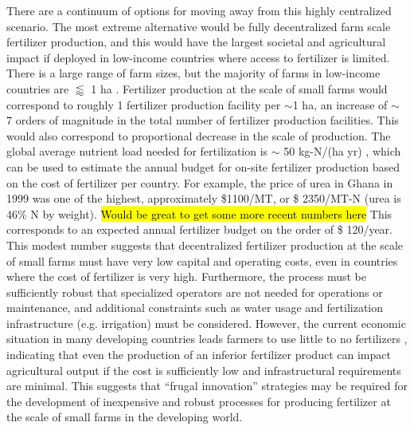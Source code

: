 There are a continuum of options for moving away from this highly centralized scenario. The most extreme alternative would be fully decentralized farm scale fertilizer production, and this would have the largest societal and agricultural impact if deployed in low-income countries where access to fertilizer is limited. There is a large range of farm sizes, but the majority of farms in low-income countries are $\lessapprox$  1 ha \cite{Lowder_2016}. Fertilizer production at the scale of small farms would  correspond to roughly 1 fertilizer production facility per $\sim$1 ha, an increase of $\sim$ 7 orders of magnitude in the total number of fertilizer production facilities. This would also correspond to proportional decrease in the scale of production.
The global average nutrient load needed for fertilization is $\sim$ 50 kg-N/(ha yr) \needcite, which
 can be used to estimate the annual budget for on-site fertilizer production based on the cost of fertilizer per country. For example, the price of urea in Ghana in 1999 was one of the highest, approximately \$1100/MT, or \$ 2350/MT-N (urea is 46\% N by weight). \needcite \hl{Would be great to get some more recent numbers here}
 This corresponds to an expected annual fertilizer budget on the order of \$ 120/year. This modest number suggests that decentralized fertilizer production at the scale of small farms must have very low capital and operating costs, even in countries where the cost of fertilizer is very high. Furthermore, the process must be sufficiently robust that specialized operators are not needed for operations or maintenance, and additional constraints such as water usage and fertilization infrastructure (e.g. irrigation) must be considered. However, the current economic situation in many developing countries leads farmers to use little to no fertilizers \needcite, indicating that even the production of an inferior fertilizer product can impact agricultural output if the cost is sufficiently low and infrastructural requirements are minimal. This suggests that ``frugal innovation'' strategies \cite{Weyrauch_2016} may be required for the development of inexpensive and robust processes for producing fertilizer at the scale of small farms in the developing world.
 
